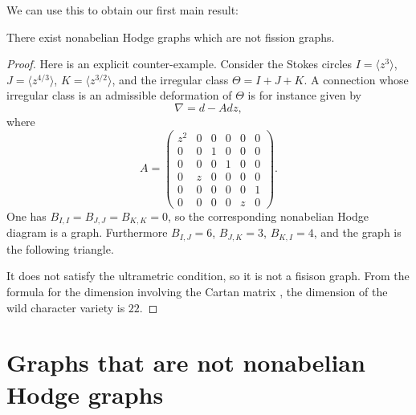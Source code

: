 \documentclass[11pt,a4paper]{amsart}
\numberwithin{equation}{section}
\newcommand{\cir}[1]{\langle #1 \rangle}
\begin{document}
We can use this to obtain our first main result:

\begin{proposition}
\label{prop:counter_example_fission_graph}
There exist nonabelian Hodge graphs which are not fission graphs. 
\end{proposition}

\begin{proof}
Here is an explicit counter-example. Consider the Stokes circles $I=\cir{z^3}$, $J=\cir{z^{4/3}}$, $K=\cir{z^{3/2}}$, and the irregular  class $\Theta=I+J+K$.
A connection whose irregular class is an admissible deformation of $\Theta$ is for instance given by
\[
\nabla=d-Adz, 
\]
where
\[
A=\begin{pmatrix}
z^2 & 0 & 0 & 0 & 0& 0\\
0 & 0 & 1 & 0 & 0 & 0\\
0 & 0 & 0 & 1 & 0 & 0\\
0 & z & 0 & 0 & 0 & 0\\
0 & 0 & 0 & 0 & 0 & 1\\
0 & 0 & 0 & 0 & z & 0
\end{pmatrix}.
\]
One has $B_{I,I}=B_{J,J}=B_{K,K}=0$, so the corresponding nonabelian Hodge diagram is a graph. Furthermore $B_{I,J}=6$, $B_{J,K}=3$, $B_{K,I}=4$, and the graph is the following triangle. 
\begin{center}
\end{center}
It does not satisfy the ultrametric condition, so it is not a fisison graph. From the formula for the dimension involving the Cartan matrix \cite{boalch2020diagrams, doucot2021diagrams}, the dimension of the wild character variety is $22$. 
\end{proof}


\section{Graphs that are not nonabelian Hodge graphs}
\label{sec:general_case}
\end{document}
